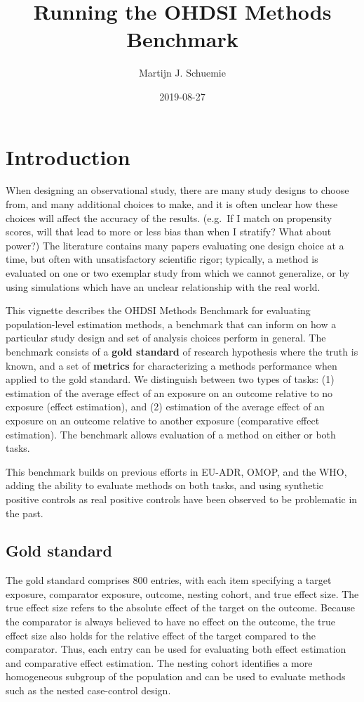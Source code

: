 \documentclass[]{article}
\title{Running the OHDSI Methods Benchmark}
\author{Martijn J. Schuemie}
\date{2019-08-27}
\begin{document}
\maketitle

{
\setcounter{tocdepth}{2}
\tableofcontents
}
\hypertarget{introduction}{%
\section{Introduction}\label{introduction}}

When designing an observational study, there are many study designs to
choose from, and many additional choices to make, and it is often
unclear how these choices will affect the accuracy of the results.
(e.g.~If I match on propensity scores, will that lead to more or less
bias than when I stratify? What about power?) The literature contains
many papers evaluating one design choice at a time, but often with
unsatisfactory scientific rigor; typically, a method is evaluated on one
or two exemplar study from which we cannot generalize, or by using
simulations which have an unclear relationship with the real world.

This vignette describes the OHDSI Methods Benchmark for evaluating
population-level estimation methods, a benchmark that can inform on how
a particular study design and set of analysis choices perform in
general. The benchmark consists of a \textbf{gold standard} of research
hypothesis where the truth is known, and a set of \textbf{metrics} for
characterizing a methods performance when applied to the gold standard.
We distinguish between two types of tasks: (1) estimation of the average
effect of an exposure on an outcome relative to no exposure (effect
estimation), and (2) estimation of the average effect of an exposure on
an outcome relative to another exposure (comparative effect estimation).
The benchmark allows evaluation of a method on either or both tasks.

This benchmark builds on previous efforts in EU-ADR, OMOP, and the WHO,
adding the ability to evaluate methods on both tasks, and using
synthetic positive controls as real positive controls have been observed
to be problematic in the past.

\hypertarget{gold-standard}{%
\subsection{Gold standard}\label{gold-standard}}

The gold standard comprises 800 entries, with each item specifying a
target exposure, comparator exposure, outcome, nesting cohort, and true
effect size. The true effect size refers to the absolute effect of the
target on the outcome. Because the comparator is always believed to have
no effect on the outcome, the true effect size also holds for the
relative effect of the target compared to the comparator. Thus, each
entry can be used for evaluating both effect estimation and comparative
effect estimation. The nesting cohort identifies a more homogeneous
subgroup of the population and can be used to evaluate methods such as
the nested case-control design.
\end{document}
